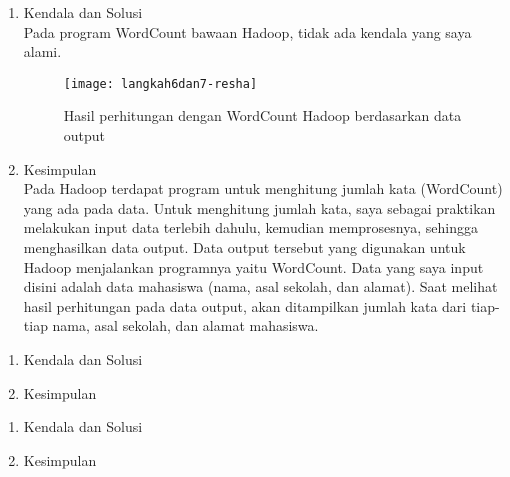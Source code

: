 \begin{enumerate}
\item Kendala dan Solusi \\
Pada program WordCount bawaan Hadoop, tidak ada kendala yang saya alami.

\begin{figure}[!ht]
\texttt{[image: langkah6dan7-resha]}
\caption{Hasil perhitungan dengan WordCount Hadoop berdasarkan data output}
\label{gam:perkuliahan-08-12}
\end{figure}

\item Kesimpulan \\
Pada Hadoop terdapat program untuk menghitung jumlah kata (WordCount) yang ada pada data. Untuk menghitung jumlah kata, saya sebagai praktikan melakukan input data terlebih dahulu, kemudian memprosesnya, sehingga menghasilkan data output. Data output tersebut yang digunakan untuk Hadoop menjalankan programnya yaitu WordCount.
Data yang saya input disini adalah data mahasiswa (nama, asal sekolah, dan alamat). Saat melihat hasil perhitungan pada data output, akan ditampilkan jumlah kata dari tiap-tiap nama, asal sekolah, dan alamat mahasiswa.
\end{enumerate}


\begin{enumerate}
\item Kendala dan Solusi

\item Kesimpulan

\end{enumerate}

\begin{enumerate}
\item Kendala dan Solusi

\item Kesimpulan

\end{enumerate}